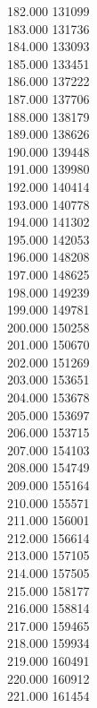 { 182.000	131099 \\
 183.000	131736 \\
 184.000	133093 \\
 185.000	133451 \\
 186.000	137222 \\
 187.000	137706 \\
 188.000	138179 \\
 189.000	138626 \\
 190.000	139448 \\
 191.000	139980 \\
 192.000	140414 \\
 193.000	140778 \\
 194.000	141302 \\
 195.000	142053 \\
 196.000	148208 \\
 197.000	148625 \\
 198.000	149239 \\
 199.000	149781 \\
 200.000	150258 \\
 201.000	150670 \\
 202.000	151269 \\
 203.000	153651 \\
 204.000	153678 \\
 205.000	153697 \\
 206.000	153715 \\
 207.000	154103 \\
 208.000	154749 \\
 209.000	155164 \\
 210.000	155571 \\
 211.000	156001 \\
 212.000	156614 \\
 213.000	157105 \\
 214.000	157505 \\
 215.000	158177 \\
 216.000	158814 \\
 217.000	159465 \\
 218.000	159934 \\
 219.000	160491 \\
 220.000	160912 \\
 221.000	161454 \\
}
